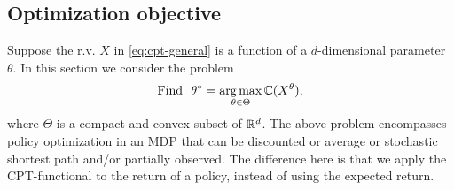 \subsection{Optimization objective} 
Suppose the r.v. $X$ in \eqref{eq:cpt-general} is a function of a $d$-dimensional parameter $\theta$. 
In this section we consider the problem 
\begin{align}
\label{eq:opt-general}
\textrm{Find ~}\theta^* = \mathop{\rm arg\,max}_{\theta \in \Theta} \mathbb{C}(X^\theta),
\end{align}
where $\Theta$ is a compact and convex subset of $\mathbb{R}^d$. The above problem encompasses policy optimization in an MDP that can be discounted or average or stochastic shortest path and/or partially observed. The difference here is that we apply the CPT-functional to the return of a policy, instead of using the expected return.  

%

